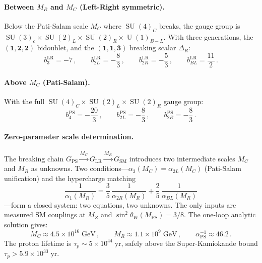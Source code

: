 \documentclass[12pt,a4paper]{article}
\theoremstyle{definition}
\newcommand{\SU}{\operatorname{SU}}
\newcommand{\U}{\operatorname{U}}
\newcommand{\MPS}{M_{\mathrm{PS}}}
\begin{document}
\paragraph{Between $M_R$ and $M_C$ (Left-Right symmetric).}
Below the Pati-Salam scale $M_C$ where $\SU(4)_C$ breaks, the gauge group is $\SU(3)_c \times \SU(2)_L \times \SU(2)_R \times \U(1)_{B-L}$.
With three generations, the $(\mathbf{1},\mathbf{2},\mathbf{2})$ bidoublet, and the $(\mathbf{1},\mathbf{1},\mathbf{3})$ breaking scalar $\Delta_R$:
\begin{equation}
b_3^{\mathrm{LR}} = -7\,, \qquad b_{2L}^{\mathrm{LR}} = -\frac{8}{3}\,, \qquad b_{2R}^{\mathrm{LR}} = -\frac{5}{3}\,, \qquad b_{BL}^{\mathrm{LR}} = \frac{11}{2}\,.
\end{equation}

\paragraph{Above $M_C$ (Pati-Salam).}
With the full $\SU(4)_C \times \SU(2)_L \times \SU(2)_R$ gauge group:
\begin{equation}
b_4^{\mathrm{PS}} = -\frac{20}{3}\,, \qquad b_{2L}^{\mathrm{PS}} = -\frac{8}{3}\,, \qquad b_{2R}^{\mathrm{PS}} = -\frac{8}{3}\,.
\end{equation}

\paragraph{Zero-parameter scale determination.}
The breaking chain $G_{\mathrm{PS}} \xrightarrow{M_C} G_{\mathrm{LR}} \xrightarrow{M_R} G_{\mathrm{SM}}$ introduces two intermediate scales $M_C$ and $M_R$ as unknowns.
Two conditions---$\alpha_3(M_C) = \alpha_{2L}(M_C)$ (Pati-Salam unification) and the hypercharge matching
\begin{equation}
\label{eq:alpha1_matching}
\frac{1}{\alpha_1(M_R)} = \frac{3}{5}\,\frac{1}{\alpha_{2R}(M_R)} + \frac{2}{5}\,\frac{1}{\alpha_{BL}(M_R)}
\end{equation}
---form a closed system: two equations, two unknowns.
The only inputs are measured SM couplings at $M_Z$ and $\sin^2\theta_W(\MPS) = 3/8$.
The one-loop analytic solution gives:
\begin{equation}
\label{eq:scale_determination}
M_C \approx 4.5 \times 10^{16}\;\mathrm{GeV}\,, \qquad M_R \approx 1.1 \times 10^{9}\;\mathrm{GeV}\,, \qquad \alpha_{\mathrm{PS}}^{-1} \approx 46.2\,.
\end{equation}
The proton lifetime is $\tau_p \sim 5 \times 10^{44}\;\mathrm{yr}$, safely above the Super-Kamiokande bound $\tau_p > 5.9 \times 10^{33}\;\mathrm{yr}$.
\end{document}
